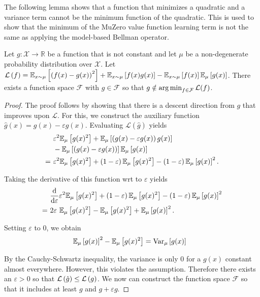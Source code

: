 The following lemma shows that a function that minimizes a quadratic and a variance term cannot be the minimum function of the quadratic. This is used to show that the minimum of the MuZero value function learning term is not the same as applying the model-based Bellman operator.

\begin{lemma}
\label{lemma_muzero}
Let $g: \mathcal{X} \rightarrow \mathbb{R}$ be a function that is not constant and let $\mu$ be a non-degenerate probability distribution over $\mathcal{X}$. 
Let $\mathcal{L}\left( f \right) = \mathbb{E}_{x\sim\mu}\left[ \left( f(x) - g(x) \right)^2 \right] + \mathbb{E}_{x\sim\mu}\left[ f(x) g(x) \right] - \mathbb{E}_{x\sim\mu}\left[ f(x) \right]\mathbb{E}_\mu\left[ g(x) \right]$.
There exists a function space $\mathcal{F}$ with $g \in \mathcal{F}$ so that $g \notin \operatorname*{arg\,min}_{f \in \mathcal{F}} \mathcal{L}(f)$.
\end{lemma}

\begin{proof}
The proof follows by showing that there is a descent direction from $g$ that improves upon $\mathcal{L}$. For this, we construct the auxiliary function $\hat{g}(x) = g(x) - \varepsilon g(x)$.
Evaluating $\mathcal{L}(\hat{g})$  yields 
\begin{align*}
     &~\varepsilon^2 \mathbb{E}_\mu\left[ g(x)^2 \right] + \mathbb{E}_\mu\left[ \left( g(x) - \varepsilon g(x) \right) g(x) \right] \\
     &~- \mathbb{E}_\mu\left[ \left( g(x) - \varepsilon g(x) \right) \right]\mathbb{E}_\mu\left[ g(x) \right]\\
     =&~\varepsilon^2 \mathbb{E}_\mu\left[ g(x)^2 \right] + \left( 1-\varepsilon \right)\mathbb{E}_\mu\left[ g(x)^2 \right] - \left( 1 - \varepsilon \right) \mathbb{E}_\mu\left[ g(x) \right]^2.
\end{align*}

Taking the derivative of this function wrt to $\varepsilon$ yields
\begin{align*}
     &~\frac{\mathrm{d}}{\mathrm{d} \varepsilon}\varepsilon^2 \mathbb{E}_\mu\left[ g(x)^2 \right] + \left( 1-\varepsilon \right)\mathbb{E}_\mu\left[ g(x)^2 \right] - \left( 1 - \varepsilon \right) \mathbb{E}_\mu\left[ g(x) \right]^2\\
     =&~2\varepsilon~\mathbb{E}_\mu\left[ g(x)^2 \right] -\mathbb{E}_\mu\left[ g(x)^2 \right] + \mathbb{E}_\mu\left[ g(x) \right]^2.
\end{align*}

Setting $\varepsilon$ to 0, we obtain
\begin{align*}
     &~\mathbb{E}_\mu\left[ g(x) \right]^2 - \mathbb{E}_\mu\left[ g(x)^2 \right] = \text{Var}_\mu\left[ g(x) \right]
\end{align*}

By the Cauchy-Schwartz inequality, the variance is only $0$ for a $g(x)$ constant almost everywhere. However, this violates the assumption.
Therefore there exists an $\varepsilon > 0$ so that $\mathcal{L}\left( \hat{g} \right) \leq \mathcal{L}\left( g \right)$.
We now can construct the function space $\mathcal{F}$ so that it includes at least $g$ and $g + \varepsilon g.$

\end{proof}

